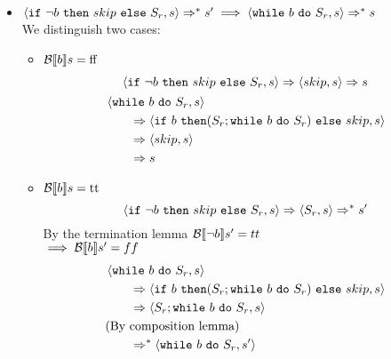 \begin{exercise}
\begin{itemize}
\begin{itemize}
            \end{itemize}
        \item $\instr{\texttt{if}\ \neg b\ \texttt{then}\ skip\ \texttt{else}\ S_r}{s} \Rightarrow^* s' \implies \instr{\texttt{while}\ b\ \texttt{do}\ S_r}{s} \Rightarrow^* s$ \\
            We distinguish two cases:
            \begin{itemize}
                \item $\mathcal{B} \llbracket  b \rrbracket s = \text{ff}$
                \begin{gather*}
                    \instr{\texttt{if}\ \neg b\ \texttt{then}\ skip\ \texttt{else}\ S_r}{s}
                    \Rightarrow
                    \instr{skip}{s}
                    \Rightarrow s
                    \\
                    \begin{align*}
                        &\instr{\texttt{while}\ b\ \texttt{do}\ S_r}{s}
                        \\&\qquad\Rightarrow \instr{\texttt{if}\ b\ \texttt{then} (S_r; \texttt{while}\ b\ \texttt{do}\ S_r)\ \texttt{else}\ skip}{s}
                        \\&\qquad\Rightarrow \instr{skip}{s}
                        \\&\qquad\Rightarrow s
                    \end{align*}
                \end{gather*}
                \item $\mathcal{B} \llbracket  b \rrbracket s = \text{tt}$
                \[
                    \instr{\texttt{if}\ \neg b\ \texttt{then}\ skip\ \texttt{else}\ S_r}{s}
                    \Rightarrow
                    \instr{S_r}{s}
                    \Rightarrow^* s'
                \]
                By the termination lemma $\mathcal{B} \llbracket  \neg b \rrbracket s' = tt$ \\
                $\implies \mathcal{B} \llbracket  b \rrbracket s' = ff$
                \begin{align*}
                    &\instr{\texttt{while}\ b\ \texttt{do}\ S_r}{s}
                    \\&\qquad\Rightarrow \instr{\texttt{if}\ b\ \texttt{then} (S_r; \texttt{while}\ b\ \texttt{do}\ S_r)\ \texttt{else}\ skip}{s}
                    \\&\qquad\Rightarrow \instr{S_r; \texttt{while}\ b\ \texttt{do}\ S_r}{s}
                    \\&\text{(By composition lemma)}
                    \\&\qquad\Rightarrow^* \instr{\texttt{while}\ b\ \texttt{do}\ S_r}{s'}

\end{align*}
\end{itemize}
\end{itemize}
\end{exercise}

